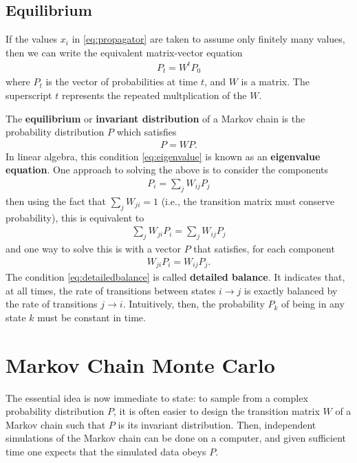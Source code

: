 \documentclass[11pt]{article}
\begin{document}
\subsection{Equilibrium}
\label{sec:org8f32af4}
If the values \(x_{i}\) in \eqref{eq:propagator} are taken to assume only
finitely many values, then we can write the equivalent matrix-vector equation
\begin{align*}
P_{t} = W^{t} P_{0}
\end{align*}
where \(P_{t}\) is the vector of probabilities at time \(t\), and \(W\) is a
matrix. The superscript \(t\) represents the repeated multplication of the \(W\).

The \textbf{equilibrium} or \textbf{invariant distribution} of a Markov chain is the
probability distribution \(P\) which satisfies
\begin{align}
\label{eq:eigenvalue}
P = WP.
\end{align}
In linear algebra, this condition \eqref{eq:eigenvalue} is known as an \textbf{eigenvalue equation}. One
approach to solving the above is to consider the components
\begin{align*}
P_{i} = \sum_{j} W_{ij} P_{j}
\end{align*}
then using the fact that \(\sum_{j} W_{ji} = 1\) (i.e., the transition matrix
must conserve probability), this is equivalent to
\begin{align*}
\sum_{j} W_{ji} P_{i} = \sum_{j} W_{ij}P_{j}
\end{align*}
and one way to solve this is with a vector \(P\) that satisfies, for each component
\begin{align}
\label{eq:detailedbalance}
W_{ji}P_{i} = W_{ij}P_{j}.
\end{align}
The condition \eqref{eq:detailedbalance} is called \textbf{detailed balance}. It
indicates that, at all times, the rate of transitions between states \(i \to j\)
is exactly balanced by the rate of transitions \(j \to i\). Intuitively, then,
the probability \(P_{k}\) of being in any state \(k\) must be constant in time.
\section{Markov Chain Monte Carlo}
\label{sec:org093bac0}
The essential idea is now immediate to state: to sample from a complex
probability distribution \(P\), it is often easier to design the transition
matrix \(W\) of a Markov chain such that \(P\) is its invariant distribution.
Then, independent simulations of the Markov chain can be done on a computer, and
given sufficient time one expects that the simulated data obeys \(P\).
\end{document}
